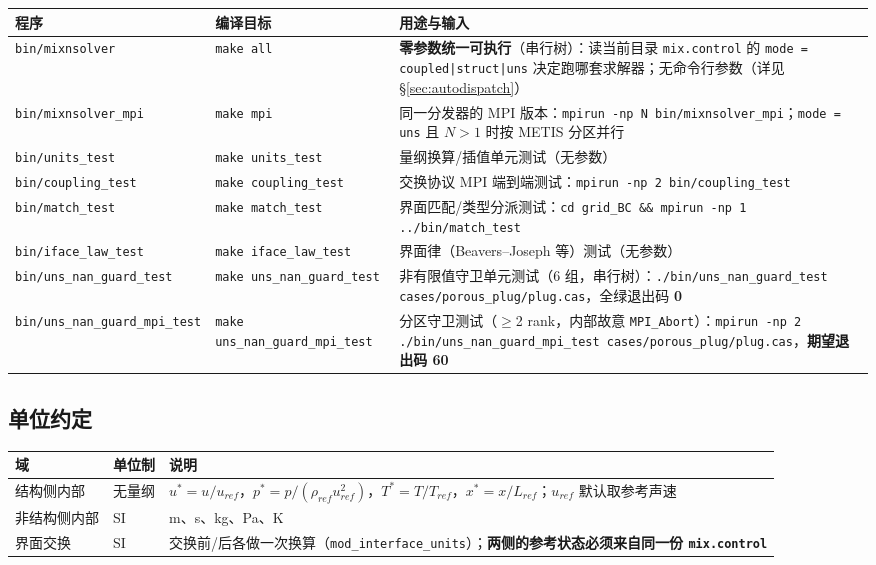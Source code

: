 \documentclass[11pt,a4paper]{ctexart}
\begin{document}
\begin{center}\small
\begin{tabular}{@{}>{\raggedright\arraybackslash}p{}>{\raggedright\arraybackslash}p{}>{\raggedright\arraybackslash}p{}@{}}
\toprule
程序 & 编译目标 & 用途与输入 \\
\midrule
\texttt{bin/mixnsolver} & \texttt{make all} & \textbf{零参数统一可执行}（串行树）：读当前目录 \texttt{mix.control} 的 \texttt{mode = coupled|struct|uns} 决定跑哪套求解器；无命令行参数（详见 \S\ref{sec:autodispatch}） \\
\texttt{bin/mixnsolver\_mpi} & \texttt{make mpi} & 同一分发器的 MPI 版本：\texttt{mpirun -np N bin/mixnsolver\_mpi}；\texttt{mode = uns} 且 $N>1$ 时按 METIS 分区并行 \\
\texttt{bin/units\_test} & \texttt{make units\_test} & 量纲换算/插值单元测试（无参数） \\
\texttt{bin/coupling\_test} & \texttt{make coupling\_test} & 交换协议 MPI 端到端测试：\texttt{mpirun -np 2 bin/coupling\_test} \\
\texttt{bin/match\_test} & \texttt{make match\_test} & 界面匹配/类型分派测试：\texttt{cd grid\_BC \&\& mpirun -np 1 ../bin/match\_test} \\
\texttt{bin/iface\_law\_test} & \texttt{make iface\_law\_test} & 界面律（Beavers--Joseph 等）测试（无参数） \\
\texttt{bin/uns\_nan\_guard\_test} & \texttt{make uns\_nan\_guard\_test} & 非有限值守卫单元测试（6 组，串行树）：\texttt{./bin/uns\_nan\_guard\_test cases/porous\_plug/plug.cas}，全绿退出码 \textbf{0} \\
\texttt{bin/uns\_nan\_guard\_mpi\_test} & \texttt{make uns\_nan\_guard\_mpi\_test} & 分区守卫测试（$\ge$2 rank，内部故意 \texttt{MPI\_Abort}）：\texttt{mpirun -np 2 ./bin/uns\_nan\_guard\_mpi\_test cases/porous\_plug/plug.cas}，\textbf{期望退出码 60} \\
\bottomrule
\end{tabular}
\end{center}

\subsection{单位约定}\label{sec:units}

\begin{center}\small
\begin{tabular}{@{}>{\raggedright\arraybackslash}p{}>{\raggedright\arraybackslash}p{}>{\raggedright\arraybackslash}p{}@{}}
\toprule
域 & 单位制 & 说明 \\
\midrule
结构侧内部 & 无量纲 & $u^* = u/u_{ref}$，$p^* = p/(\rho_{ref}u_{ref}^2)$，$T^* = T/T_{ref}$，$x^* = x/L_{ref}$；$u_{ref}$ 默认取参考声速 \\
非结构侧内部 & SI & m、s、kg、Pa、K \\
界面交换 & SI & 交换前/后各做一次换算（\texttt{mod\_interface\_units}）；\textbf{两侧的参考状态必须来自同一份 \texttt{mix.control}} \\
\bottomrule
\end{tabular}
\end{center}
\end{document}
